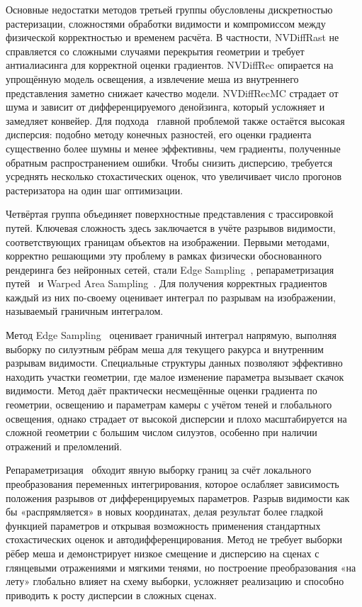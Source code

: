 Основные недостатки методов третьей группы обусловлены дискретностью
растеризации, сложностями обработки видимости и компромиссом между физической
корректностью и временем расчёта. В частности, NVDiffRast не справляется со
сложными случаями перекрытия геометрии и требует антиалиасинга для корректной
оценки градиентов. NVDiffRec опирается на упрощённую модель освещения, а
извлечение меша из внутреннего представления заметно снижает качество модели.
NVDiffRecMC страдает от шума и зависит от дифференцируемого денойзинга, который
усложняет и замедляет конвейер. Для подхода~\cite{SGORast} главной проблемой
также остаётся высокая дисперсия: подобно методу конечных разностей, его оценки
градиента существенно более шумны и менее эффективны, чем градиенты, полученные
обратным распространением ошибки. Чтобы снизить дисперсию, требуется усреднять
несколько стохастических оценок, что увеличивает число прогонов растеризатора
на один шаг оптимизации.

Четвёртая группа объединяет поверхностные представления с трассировкой путей.
Ключевая сложность здесь заключается в учёте разрывов видимости, соответствующих
границам объектов на изображении. Первыми методами, корректно решающими эту
проблему в рамках физически обоснованного рендеринга без нейронных сетей, стали
Edge Sampling~\cite{ES2018}, репараметризация путей~\cite{Reparam2019} и Warped
Area Sampling~\cite{WAS2020}. Для получения корректных градиентов каждый из них
по-своему оценивает интеграл по разрывам на изображении, называемый граничным
интегралом.

Метод Edge Sampling~\cite{ES2018} оценивает граничный интеграл напрямую,
выполняя выборку по силуэтным рёбрам меша для текущего ракурса и внутренним
разрывам видимости. Специальные структуры данных позволяют эффективно находить
участки геометрии, где малое изменение параметра вызывает скачок видимости.
Метод даёт практически несмещённые оценки градиента по геометрии, освещению и
параметрам камеры с учётом теней и глобального освещения, однако страдает от
высокой дисперсии и плохо масштабируется на сложной геометрии с большим числом
силуэтов, особенно при наличии отражений и преломлений.

Репараметризация~\cite{Reparam2019} обходит явную выборку границ за счёт
локального преобразования переменных интегрирования, которое ослабляет
зависимость положения разрывов от дифференцируемых параметров. Разрыв видимости
как бы «распрямляется» в новых координатах, делая результат более гладкой
функцией параметров и открывая возможность применения стандартных стохастических
оценок и автодифференцирования. Метод не требует выборки рёбер меша и
демонстрирует низкое смещение и дисперсию на сценах с глянцевыми отражениями и
мягкими тенями, но построение преобразования «на лету» глобально влияет на схему
выборки, усложняет реализацию и способно приводить к росту дисперсии в сложных
сценах.

